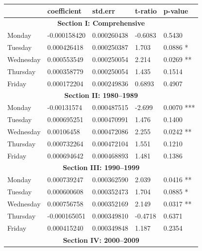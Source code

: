 \documentclass[11pt, english]{article}
\begin{document}
	\newpage

	\begin{table}[h]
		\scriptsize
		\renewcommand{\arraystretch}{1.25}
	\begin{center}
	\begin{tabular}{p{2cm}p{2cm}p{2cm}p{2cm}p{2cm}}
		& \textbf{coefficient} & \textbf{std.err} & \textbf{t-ratio} & \textbf{p-value}\\
		\hline
		\multicolumn{5}{c}{\textbf{Section I: Comprehensive}}\\
		\hline
		Monday & -0.000158420 & 0.000260438 & -0.6083 & 0.5430\\
		Tuesday & 0.000426418 & 0.000250387 & 1.703 & 0.0886 *\\
		Wednesday & 0.000553549 & 0.000250054 & 2.214 & 0.0269 **\\
		Thursday & 0.000358779 & 0.000250054 & 1.435 & 0.1514\\
		Friday & 0.000172204 & 0.000249836 & 0.6893 & 0.4907\\
		\hline
		\multicolumn{5}{c}{\textbf{Section II: 1980--1989}}\\
		\hline            
		Monday & -0.00131574 & 0.000487515 & -2.699 & 0.0070 ***\\   
                Tuesday & 0.000695251 & 0.000470991 & 1.476 & 0.1400\\  
                Wednesday & 0.00106458 & 0.000472086 & 2.255 & 0.0242 **\\
                Thursday & 0.000732264 & 0.000472104 & 1.551 & 0.1210\\
                Friday & 0.000694642 & 0.000468893 & 1.481 & 0.1386\\ 
                \hline                                             
                \multicolumn{5}{c}{\textbf{Section III: 1990--1999}}\\
		\hline            
		Monday & 0.000739247 & 0.000362590 & 2.039 & 0.0416 **\\   
		Tuesday & 0.000600608 & 0.000352473 & 1.704 & 0.0885 *\\  
                Wednesday & 0.000756758 & 0.000352169 & 2.149 & 0.0317 **\\
                Thursday & -0.000165051 & 0.000349810 & -0.4718 & 0.6371\\
                Friday & 0.000415240 & 0.000349848 & 1.187 & 0.2354\\ 
                \hline                                             
                \multicolumn{5}{c}{\textbf{Section IV: 2000--2009}}\\

\end{tabular}
\end{center}
\end{table}
\end{document}
